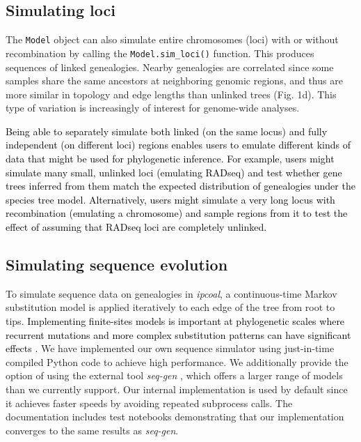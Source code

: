 \documentclass[11pt]{article}
\begin{document}
\subsection{Simulating loci}
The \texttt{Model} object can also simulate entire chromosomes (loci) with or without recombination by calling the \texttt{Model.sim\_loci()} function. This produces sequences of linked genealogies. Nearby genealogies are correlated since some samples share the same ancestors at neighboring genomic regions, and thus are more similar in topology and edge lengths than unlinked trees (Fig. 1d). This type of variation is increasingly of interest for genome-wide analyses.

\textcolor{black}{Being able to separately simulate both linked (on the same locus) and fully independent (on different loci) regions enables users to emulate different kinds of data that might be used for phylogenetic inference. For example, users might simulate many small, unlinked loci (emulating RADseq) and test whether gene trees inferred from them match the expected distribution of genealogies under the species tree model. Alternatively, users might simulate a very long locus with recombination (emulating a chromosome) and sample regions from it to test the effect of assuming that RADseq loci are completely unlinked.}

\subsection{Simulating sequence evolution}
To simulate sequence data on genealogies in \emph{ipcoal}, a continuous-time Markov substitution model is applied iteratively to each edge of the tree from root to tips. \textcolor{black}{Implementing finite-sites models is important at phylogenetic scales where recurrent mutations and more complex substitution patterns can have significant effects \citep{kim_inconsistency_1996,felsenstein_parsimony_1978}.} We have implemented our own sequence simulator using just-in-time compiled Python code to achieve high performance. We additionally provide the option of using the external tool \emph{seq-gen} \citep{rambaut_seqgen_1997}, which offers a larger range of models than we currently support. Our internal implementation is used by default since it achieves faster speeds by avoiding repeated subprocess calls. The documentation includes test notebooks demonstrating that our implementation converges to the same results as \emph{seq-gen}.
\end{document}
